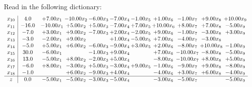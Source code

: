 \documentclass[9pt]{article}
\begin{document}
Read in the following dictionary:
\[\begin{array}{c| c c@{\hskip 2pt} c@{\hskip 2pt} c@{\hskip 2pt} c@{\hskip 2pt} c@{\hskip 2pt} c@{\hskip 2pt} c@{\hskip 2pt} c@{\hskip 2pt} c@{\hskip 2pt} }
 x_{10}   &  4.0 & +  7.00 x_{1} & -10.00 x_{2} & -6.00 x_{3} & -7.00 x_{4} & -1.00 x_{5} & +  1.00 x_{6} & -1.00 x_{7} & +  9.00 x_{8} & + 10.00 x_{9}\\
 x_{11}   &  -16.0 & -10.00 x_{1} & +  5.00 x_{2} & +  5.00 x_{3} & -7.00 x_{4} & +  7.00 x_{5} & + 10.00 x_{6} & +  8.00 x_{7} & +  7.00 x_{8} & -5.00 x_{9}\\
 x_{12}   &  -7.0 & +  3.00 x_{1} & +  9.00 x_{2} & -7.00 x_{3} & +  2.00 x_{4} & -2.00 x_{5} & +  9.00 x_{6} & -1.00 x_{7} & -3.00 x_{8} & +  3.00 x_{9}\\
 x_{13}   &  -3.0 & -2.00 x_{1} & +  9.00 x_{2} &   & +  1.00 x_{4} & -5.00 x_{5} & +  7.00 x_{6} & -4.00 x_{7} & -3.00 x_{8} &   \\
 x_{14}   &  -5.0 & +  5.00 x_{1} & +  6.00 x_{2} & -6.00 x_{3} & -9.00 x_{4} & +  3.00 x_{5} & +  2.00 x_{6} & -8.00 x_{7} & + 10.00 x_{8} & -1.00 x_{9}\\
 x_{15}   &  30.0 & -6.00 x_{1} &   & -1.00 x_{3} & +  9.00 x_{4} &   & +  7.00 x_{6} & -10.00 x_{7} & -8.00 x_{8} & -5.00 x_{9}\\
 x_{16}   &  13.0 & -5.00 x_{1} & +  8.00 x_{2} & -2.00 x_{3} & +  5.00 x_{4} &   & -8.00 x_{6} & -10.00 x_{7} & +  8.00 x_{8} & +  5.00 x_{9}\\
 x_{17}   &  -6.0 & +  8.00 x_{1} & -3.00 x_{2} & +  5.00 x_{3} & -3.00 x_{4} & +  9.00 x_{5} & -1.00 x_{6} & -9.00 x_{7} & +  9.00 x_{8} & -8.00 x_{9}\\
 x_{18}   &  -1.0  &   & +  6.00 x_{2} & -9.00 x_{3} & +  4.00 x_{4} &   & -4.00 x_{6} & +  3.00 x_{7} & +  6.00 x_{8} & -4.00 x_{9}\\
\hline
z    &  0.0 & -5.00 x_{1} & -5.00 x_{2} & -3.00 x_{3} & -5.00 x_{4} &   & -3.00 x_{6} & -5.00 x_{7} &   & -5.00 x_{9}\\
\end{array}\]
\end{document}
